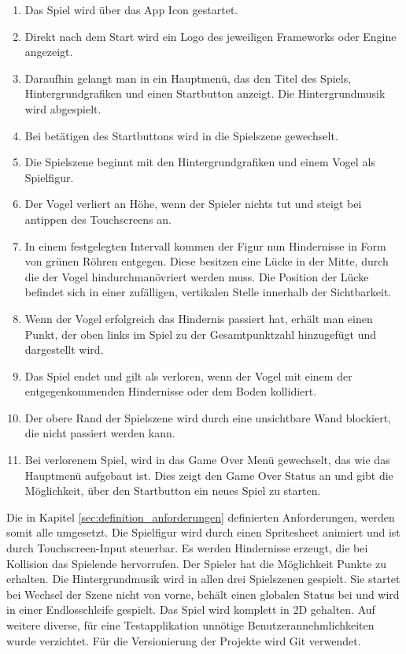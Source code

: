 \begin{enumerate}
	\item Das Spiel wird über das App Icon gestartet.
	\item Direkt nach dem Start wird ein Logo des jeweiligen Frameworks oder Engine angezeigt.
	\item Daraufhin gelangt man in ein Hauptmenü, das den Titel des Spiels, Hintergrundgrafiken und einen Startbutton anzeigt. Die Hintergrundmusik wird abgespielt.
	\item Bei betätigen des Startbuttons wird in die Spielszene gewechselt.
	\item Die Spielszene beginnt mit den Hintergrundgrafiken und einem Vogel als Spielfigur.
	\item Der Vogel verliert an Höhe, wenn der Spieler nichts tut und steigt bei antippen des Touchscreens an.
	\item In einem festgelegten Intervall kommen der Figur nun Hindernisse in Form von grünen Röhren entgegen. Diese besitzen eine Lücke in der Mitte, durch die der Vogel hindurchmanövriert werden muss. Die Position der Lücke befindet sich in einer zufälligen, vertikalen Stelle innerhalb der Sichtbarkeit.
	\item Wenn der Vogel erfolgreich das Hindernis passiert hat, erhält man einen Punkt, der oben links im Spiel zu der Gesamtpunktzahl hinzugefügt und dargestellt wird.
	\item Das Spiel endet und gilt als verloren, wenn der Vogel mit einem der entgegenkommenden Hindernisse oder dem Boden kollidiert.
	\item Der obere Rand der Spielszene wird durch eine unsichtbare Wand blockiert, die nicht passiert werden kann.
	\item Bei verlorenem Spiel, wird in das Game Over Menü gewechselt, das wie das Hauptmenü aufgebaut ist. Dies zeigt den Game Over Status an und gibt die Möglichkeit, über den Startbutton ein neues Spiel zu starten.
\end{enumerate}



Die in Kapitel \ref{sec:definition_anforderungen} definierten Anforderungen, werden somit alle umgesetzt. Die Spielfigur wird durch einen Spritesheet animiert und ist durch Touchscreen-Input steuerbar. Es werden Hindernisse erzeugt, die bei Kollision das Spielende hervorrufen. Der Spieler hat die Möglichkeit Punkte zu erhalten.
Die Hintergrundmusik wird in allen drei Spielszenen gespielt. Sie startet bei Wechsel der Szene nicht von vorne, behält einen globalen Status bei und wird in einer Endlosschleife gespielt. Das Spiel wird komplett in 2D gehalten. Auf weitere diverse, für eine Testapplikation unnötige Benutzerannehmlichkeiten wurde verzichtet. Für die Versionierung der Projekte wird Git verwendet.

